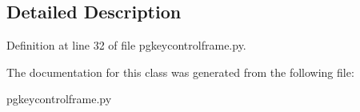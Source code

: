 \subsection{Detailed Description}


Definition at line 32 of file pgkeycontrolframe.\+py.



The documentation for this class was generated from the following file\+:\begin{DoxyCompactItemize}
\item 
pgkeycontrolframe.\+py\end{DoxyCompactItemize}
